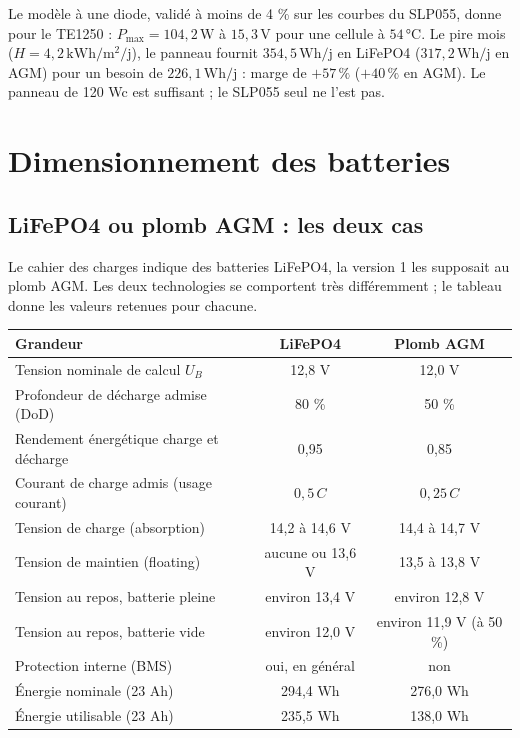\documentclass[11pt,a4paper]{article}
\newcommand{\U}[1]{\,\mathrm{#1}}
\begin{document}
\begin{resume}
Le modèle à une diode, validé à moins de 4 \% sur les courbes du SLP055, donne pour le TE1250 : $P_{\max} = 104{,}2\U{W}$ à $15{,}3\U{V}$ pour une cellule à $54\U{°C}$. Le pire mois ($H = 4{,}2\U{kWh/m^2/j}$), le panneau fournit $354{,}5\U{Wh/j}$ en LiFePO4 ($317{,}2\U{Wh/j}$ en AGM) pour un besoin de $226{,}1\U{Wh/j}$ : marge de $+57\U{\%}$ ($+40\U{\%}$ en AGM). Le panneau de 120 Wc est suffisant ; le SLP055 seul ne l'est pas.
\end{resume}

\newpage
\section{Dimensionnement des batteries}
\label{sec:batterie}

\subsection{LiFePO4 ou plomb AGM : les deux cas}

Le cahier des charges indique des batteries LiFePO4, la version 1 les supposait au plomb AGM. Les deux technologies se comportent très différemment ; le tableau donne les valeurs retenues pour chacune.

\begin{center}
\begin{tabular}{l c c}
\toprule
\textbf{Grandeur} & \textbf{LiFePO4} & \textbf{Plomb AGM} \\
\midrule
Tension nominale de calcul $U_B$ & 12,8 V & 12,0 V \\
Profondeur de décharge admise (DoD) & 80 \% & 50 \% \\
Rendement énergétique charge et décharge & 0,95 & 0,85 \\
Courant de charge admis (usage courant) & $0{,}5\,C$ & $0{,}25\,C$ \\
Tension de charge (absorption) & 14,2 à 14,6 V & 14,4 à 14,7 V \\
Tension de maintien (floating) & aucune ou 13,6 V & 13,5 à 13,8 V \\
Tension au repos, batterie pleine & environ 13,4 V & environ 12,8 V \\
Tension au repos, batterie vide & environ 12,0 V & environ 11,9 V (à 50 \%) \\
Protection interne (BMS) & oui, en général & non \\
\midrule
Énergie nominale (23 Ah) & 294,4 Wh & 276,0 Wh \\
Énergie utilisable (23 Ah) & 235,5 Wh & 138,0 Wh \\
\bottomrule
\end{tabular}
\end{center}
\end{document}
